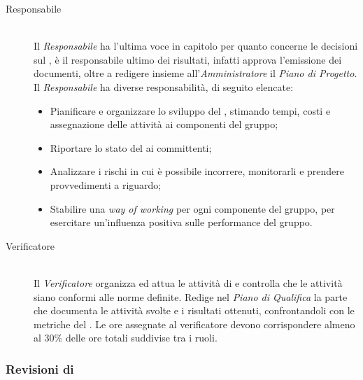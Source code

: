 \begin{description}
\item[Responsabile] \hfill \\ Il \textit{Responsabile} ha l'ultima voce in capitolo per quanto concerne le decisioni sul , \`e il responsabile ultimo dei risultati, infatti approva l'emissione dei documenti, oltre a redigere insieme all'\textit{Amministratore} il \textit{Piano di Progetto}. Il \textit{Responsabile} ha diverse responsabilit\`a, di seguito elencate:
  \begin{itemize}

  \item Pianificare e organizzare lo sviluppo del , stimando tempi, costi e assegnazione delle attivit\`a ai componenti del gruppo;
  \item Riportare lo stato del  ai committenti;
  \item Analizzare i rischi in cui è possibile incorrere, monitorarli e prendere provvedimenti a riguardo;
  \item Stabilire una \textit{way of working} per ogni componente del gruppo, per esercitare un'influenza positiva sulle performance del gruppo.
    
  \end{itemize}

\item[Verificatore] \hfill \\ Il \textit{Verificatore} organizza ed attua le attivit\`a di  e controlla che le attivit\`a siano conformi alle norme definite. Redige nel \textit{Piano di Qualifica} la parte che documenta le attivit\`a svolte e i risultati ottenuti, confrontandoli con le metriche del \PianoDiQualifica. Le ore assegnate al verificatore devono corrispondere almeno al 30\% delle ore totali suddivise tra i ruoli.
  
\end{description}

\subsubsection{Revisioni di }

